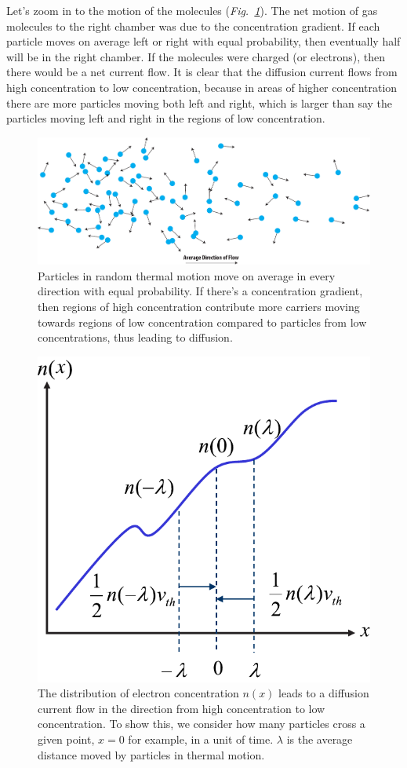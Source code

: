 Let’s zoom in to the motion of the molecules (\emph{Fig.~\ref{fig:random_flow}}).  The net motion of gas molecules to the right chamber was due to the concentration gradient.  If each particle moves on average left or right with equal probability, then eventually half will be in the right chamber. If the molecules were charged (or electrons), then there would be a net current flow.  It is clear that the diffusion current flows from high concentration to low concentration, because in areas of higher concentration there are more particles moving both left and right, which is larger than say the particles moving left and right in the regions of low concentration.
\begin{figure}[H]
\centering
\includegraphics[width=\columnwidth]{random_flow}
\caption{Particles in random thermal motion move on average in every direction with equal probability.  If there's a concentration gradient, then regions of high concentration contribute more carriers moving towards regions of low concentration compared to particles from low concentrations, thus leading to diffusion.}
\label{fig:random_flow}
\end{figure}
\newpage
\begin{figure}[tb]
\centering
\includegraphics[width=.45\columnwidth]{slide48}
\caption{The distribution of electron concentration $n(x)$ leads to a diffusion current flow in the direction from high concentration to low concentration.  To show this, we consider how many particles cross a given point, $x=0$ for example, in a unit of time.  $\lambda$ is the average distance moved by particles in thermal motion.}
\label{fig:slide48}
\end{figure}
